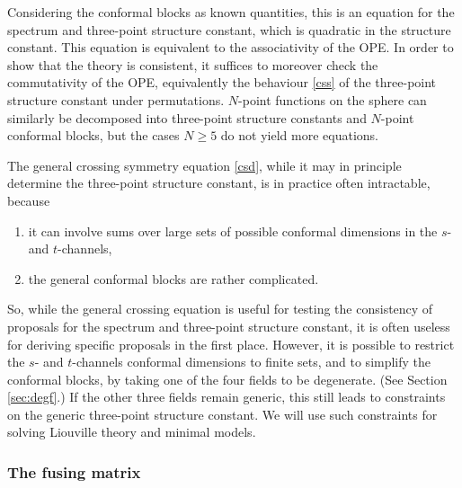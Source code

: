 \documentclass[12pt, a4paper, notitlepage, twoside]{report}
\numberwithin{equation}{section}
\theoremstyle{break}
\begin{document}
Considering the conformal blocks as known quantities, this is an equation for the spectrum and three-point structure constant, which is quadratic in the structure constant.
This equation is equivalent to the associativity of the OPE. In order to show that the theory is consistent, it suffices to moreover check the commutativity of the OPE, equivalently the behaviour \eqref{css} of the three-point structure constant under permutations. 
$N$-point functions on the sphere can similarly be decomposed into three-point structure constants and $N$-point conformal blocks, but the cases $N\geq 5$ do not yield more equations. 

The general crossing symmetry equation \eqref{csd}, while it may in principle determine the three-point structure constant, is in practice often intractable, because
\begin{enumerate}
 \item it can involve sums over large sets of possible conformal dimensions in the $s$- and $t$-channels, 
 \item the general conformal blocks are rather complicated. 
\end{enumerate}
So, while the general crossing equation is useful for testing the consistency of proposals for the spectrum and three-point structure constant, it is often useless for deriving specific proposals in the first place. However, it is possible to restrict the $s$- and $t$-channels conformal dimensions to finite sets, and to simplify the conformal blocks, by taking one of the four fields to be degenerate. (See Section \ref{sec:degf}.) If the other three fields remain generic, this still leads to constraints on the generic three-point structure constant. We will use such constraints for solving Liouville theory and minimal models.

\subsubsection{The fusing matrix}
\end{document}
